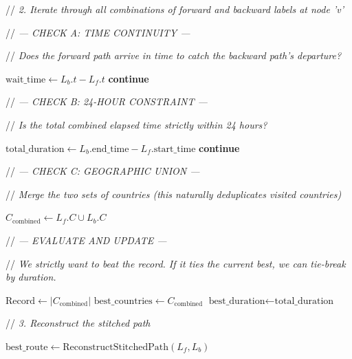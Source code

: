 \documentclass{article}
\newcommand{\CommentLine}[1]{
    \State // \textit{#1}
}
\begin{document}
\begin{algorithmic}[1]
        \vspace{0.5em}
        \CommentLine{2. Iterate through all combinations of forward and backward labels at node 'v'}

                \vspace{0.5em}
                \CommentLine{--- CHECK A: TIME CONTINUITY ---}
                \CommentLine{Does the forward path arrive in time to catch the backward path's departure?}
                \State $\text{wait\_time} \leftarrow L_b.t - L_f.t$
                    \State \textbf{continue}
                \EndIf

                \vspace{0.5em}
                \CommentLine{--- CHECK B: 24-HOUR CONSTRAINT ---}
                \CommentLine{Is the total combined elapsed time strictly within 24 hours?}
                \State $\text{total\_duration} \leftarrow L_b.\text{end\_time} - L_f.\text{start\_time}$
                    \State \textbf{continue}
                \EndIf

                \vspace{0.5em}
                \CommentLine{--- CHECK C: GEOGRAPHIC UNION ---}
                \CommentLine{Merge the two sets of countries (this naturally deduplicates visited countries)}
                \State $C_{\text{combined}} \leftarrow L_f.C \cup L_b.C$

                \vspace{0.5em}
                \CommentLine{--- EVALUATE AND UPDATE ---}
                \CommentLine{We strictly want to beat the record. If it ties the current best, we can tie-break by duration.}
                    \State $\text{Record} \leftarrow |C_{\text{combined}}|$ 
                    \State $\text{best\_countries} \leftarrow C_{\text{combined}}$
                    \State $\text{best\_duration} \leftarrow \text{total\_duration}$

                    \vspace{0.5em}
                    \CommentLine{3. Reconstruct the stitched path}
                    \State $\text{best\_route} \leftarrow \text{ReconstructStitchedPath}(L_f, L_b)$
                \EndIf
            \EndFor
        \EndFor
    \EndFor


\end{algorithmic}
\end{document}
